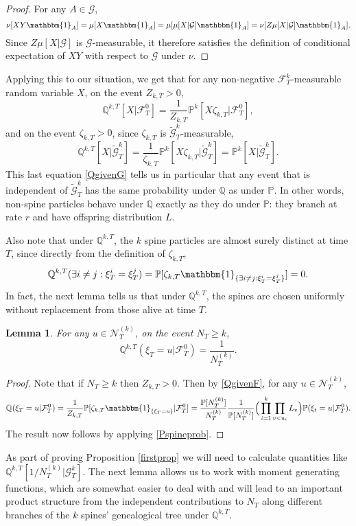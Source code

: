\documentclass{article}
\theoremstyle{plain}
\newtheorem{lem}[thm]{Lemma}
\theoremstyle{definition}
\newcommand{\Q}{\mathbb{Q}}
\renewcommand{\P}{\mathbb{P}}
\newcommand{\F}{\mathcal{F}}
\newcommand{\G}{\mathcal{G}}
\newcommand{\Gt}{\tilde{\mathcal{G}}}
\newcommand{\ind}{\mathbbm{1}}
\newcommand{\Nc}{\mathcal{N}}
\begin{document}
\begin{proof}
For any $A\in\G$,
\[\nu[XY\ind_A] = \mu[X\ind_A] = \mu[\mu[X|\G]\ind_A] = \nu[Z\mu[X|\G] \ind_A].\]
Since $Z\mu[X|\G]$ is $\G$-measurable, it therefore satisfies the definition of conditional expectation of $XY$ with respect to $\G$ under $\nu$.
\end{proof}

Applying this to our situation, we get that for any non-negative $\F^k_T$-measurable random variable $X$, on the event $Z_{k,T}>0$,
\begin{equation}\label{QgivenF}
\Q^{k,T}[X|\F^0_T] = \frac{1}{Z_{k,T}}\P^k[X\zeta_{k,T}|\F^0_T],
\end{equation}
and on the event $\zeta_{k,T}>0$, since $\zeta_{k,T}$ is $\Gt^k_T$-measurable,
\begin{equation}\label{QgivenG}
\Q^{k,T}[X|\Gt^k_T] = \frac{1}{\zeta_{k,T}}\P^k[X\zeta_{k,T}|\Gt^k_T] = \P^k[X|\Gt^k_T].
\end{equation}
This last equation \eqref{QgivenG} tells us in particular that any event that is independent of $\Gt^k_T$ has the same probability under $\Q$ as under $\P$. In other words, non-spine particles behave under $\Q$ exactly as they do under $\P$: they branch at rate $r$ and have offspring distribution $L$.

Also note that under $\Q^{k,T}$, the $k$ spine particles are almost surely distinct at time $T$, since directly from the definition of $\zeta_{k,T}$,
\[\Q^{k,T}(\exists i\neq j : \xi^i_T=\xi^j_T) = \P[\zeta_{k,T}\ind_{\{\exists i\neq j : \xi^i_T=\xi^j_T\}}] = 0.\]
In fact, the next lemma tells us that under $\Q^{k,T}$, the spines are chosen uniformly without replacement from those alive at time $T$.

\begin{lem}\label{Quniform}
For any $u\in \Nc_T^{(k)}$, on the event $N_T\ge k$,
\[\Q^{k,T}(\xi_T = u | \F^0_T) = \frac{1}{N_T^{(k)}}.\]
\end{lem}

\begin{proof}
Note that if $N_T\ge k$ then $Z_{k,T}>0$. Then by \eqref{QgivenF}, for any $u\in \Nc_T^{(k)}$,
\[\Q(\xi_T = u | \F^0_T)  = \frac{1}{Z_{k,T}} \P[\zeta_{k,T}\ind_{\{\xi_T = u\}} | \F^0_T ] = \frac{\P[N_T^{(k)}]}{N_T^{(k)}} \frac{1}{\P[N_T^{(k)}]}\Big(\prod_{i=1}^k \prod_{v<u_i} L_v\Big) \P(\xi_t = u | \F^0_T).\]
The result now follows by applying \eqref{Pspineprob}.
\end{proof}


As part of proving Proposition \ref{firstprop} we will need to calculate quantities like $\Q^{k,T}[1/N_T^{(k)}|\G^k_T]$. The next lemma allows us to work with moment generating functions, which are somewhat easier to deal with and will lead to an important product structure from the  independent contributions to $N_T$ along different branches of the $k$ spines' genealogical tree under $\Q^{k,T}$.
\end{document}
